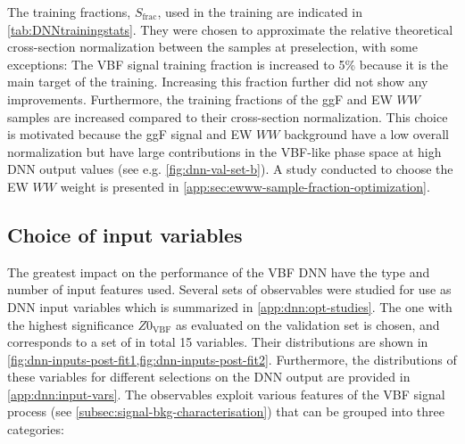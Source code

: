 The training fractions, $S_\text{frac}$, used in the training are indicated in \cref{tab:DNNtrainingstats}. They were chosen to approximate the relative theoretical cross-section normalization between the samples at preselection, with some exceptions: The VBF signal training fraction is increased to 5\% because it is the main target of the training. Increasing this fraction further did not show any improvements. Furthermore, the training fractions of the ggF and EW $WW$ samples are increased compared to their cross-section normalization. 
This choice is motivated because the ggF signal and EW $WW$ background have a low overall normalization but have large contributions in the VBF-like phase space at high DNN output values (see e.g. \cref{fig:dnn-val-set-b}). 
A study conducted to choose the EW $WW$ weight is presented in \cref{app:sec:ewww-sample-fraction-optimization}.

\subsection{Choice of input variables}
\label{subsec:input-variables-opt}
The greatest impact on the performance of the VBF DNN have the type and number of input features used.
Several sets of observables were studied for use as DNN input variables which is summarized in \cref{app:dnn:opt-studies}.
The one with the highest significance $Z0_\mathrm{VBF}$ as evaluated on the validation set is chosen, and corresponds to a set of in total 15 variables.
Their distributions are shown in \cref{fig:dnn-inputs-post-fit1,fig:dnn-inputs-post-fit2}.
Furthermore, the distributions of these variables for different selections on the DNN output are provided in \cref{app:dnn:input-vars}. 
The observables exploit various features of the VBF signal process (see \cref{subsec:signal-bkg-characterisation}) that can be grouped into three categories:

